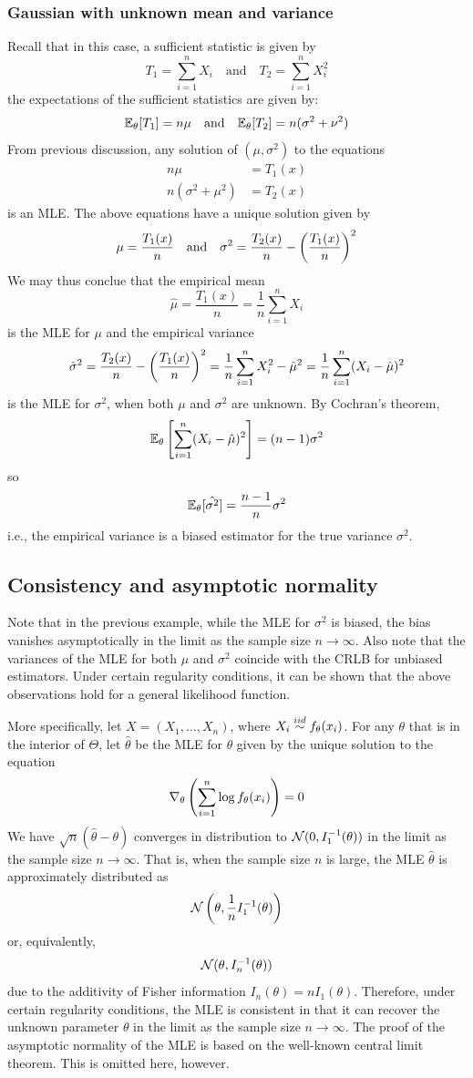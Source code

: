 \documentclass[11pt]{book}
\begin{document}
\subsubsection{Gaussian with unknown mean and variance}
Recall that in this case, a sufficient statistic is given by 
\[
  T_1 = \sum_{i=1}^n X_i \quad\text{and}\quad T_2 = \sum_{i=1}^n X_i^2
\]
the expectations of the sufficient statistics are given by: 
\[
  \mathbb{E}_\theta[T_1] = n\mu \quad\text{and}\quad \mathbb{E}_\theta[T_2] = n(\sigma^2 + \nu^2)
\]
From previous discussion, any solution of $(\mu, \sigma^2)$ to the equations 
\begin{align*}
  n\mu &= T_1(x) \\ 
  n(\sigma^2 + \mu^2) &= T_2(x)
\end{align*}
is an MLE. The above equations have a unique solution given by 
\[
  \mu = \frac{T_1(x)}{n} \quad\text{and}\quad \sigma^2 = \frac{T_2(x)}{n} - \left( \frac{T_1(x)}{n} \right)^2
\]
  We may thus conclue that the empirical mean 
  \[
    \hat{\mu} = \frac{T_1(x)}{n} = \frac{1}{n} \sum_{i=1}^n X_i
  \]
  is the MLE for $\mu$ and the empirical variance 
  \[
    \hat{\sigma}^2 = \frac{T_2(x)}{n} - \left( \frac{T_1(x)}{n} \right)^2 = \frac{1}{n}\sum_{i=1}^n X_i^2 - \hat{\mu}^2 = \frac{1}{n}\sum_{i=1}^n (X_i - \hat{\mu})^2 
  \]
  is the MLE for $\sigma^2$, when both $\mu$ and $\sigma^2$ are unknown. By Cochran's theorem,
  \[
    \mathbb{E}_\theta \left[ \sum_{i=1}^n (X_i - \hat{\mu})^2\right] = (n-1)\sigma^2 
  \]
  so 
  \[
    \mathbb{E}_\theta[\hat{\sigma^2}] = \frac{n-1}{n}\sigma^2 
  \] 
  i.e., the empirical variance is a biased estimator for the true variance $\sigma^2$.

\subsection{Consistency and asymptotic normality}
Note that in the previous example, while the MLE for $\sigma^2$ is biased, the bias vanishes asymptotically in the limit as the sample size $n\to\infty$. Also note that the variances of the MLE for both $\mu$ and $\sigma^2$ coincide with the CRLB for unbiased estimators. Under certain regularity conditions, it can be shown that the above observations hold for a general likelihood function.

More specifically, let $X = (X_1, \dots, X_n)$, where $X_i \overset{iid}{\sim} f_\theta(x_i)$. For any $\theta$ that is in the interior of $\Theta$, let $\hat{\theta}$ be the MLE for $\theta$ given by the unique solution to the equation 
\[
  \nabla_\theta \left( \sum_{i=1}^n \log f_\theta(x_i) \right) = 0
\] 
We have $\sqrt{n}(\hat{\theta} - \theta)$ converges in distribution to $\mathcal{N}(0, I_1^{-1}(\theta))$ in the limit as the sample size $n\to\infty$.
That is, when the sample size $n$ is large, the MLE $\hat{\theta}$ is approximately distributed as 
\[
  \mathcal{N} \left( \theta, \frac{1}{n}I_1^{-1}(\theta) \right)
\] 
or, equivalently,
\[
  \mathcal{N} (\theta,I_n^{-1}(\theta))
\] 
due to the additivity of Fisher information $I_n(\theta) = n I_1(\theta)$. Therefore, under certain regularity conditions, the MLE is consistent in that it can recover the unknown parameter $\theta$ in the limit as the sample size $n\to\infty$. The proof of the asymptotic normality of the MLE is based on the well-known central limit theorem. This is omitted here, however.
\end{document}
